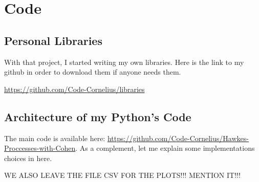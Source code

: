 \chapter{Code}

\section{Personal Libraries}
\label{personal_lib}
With that project, I started writing my own libraries. Here is the link to my github in order to download them if anyone needs them. 

\href{https://github.com/Code-Cornelius/libraries}{https://github.com/Code-Cornelius/libraries}


\section{Architecture of my Python's Code}
\label{csv-files}
The main code is available here: 
\href{https://github.com/Code-Cornelius/Hawkes-Proccesses-with-Cohen}{https://github.com/Code-Cornelius/Hawkes-Proccesses-with-Cohen}. As a complement, let me explain some implementations choices in here.



WE ALSO LEAVE THE FILE CSV FOR THE PLOTS!!! MENTION IT!!!